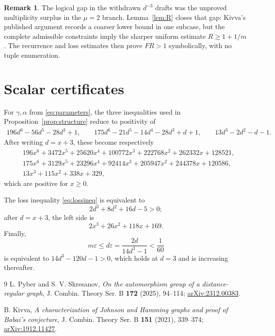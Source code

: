 \documentclass[11pt]{amsart}
\theoremstyle{definition}
\newtheorem{remark}[theorem]{Remark}
\newcommand{\eps}{\varepsilon}
\newcommand{\gam}{\gamma}
\begin{document}
\begin{remark}
The logical gap in the withdrawn $d^{-3}$ drafts was the unproved multiplicity surplus in the $\mu=2$ branch.  Lemma~\ref{lem:R} closes that gap: Kivva's published argument records a coarser lower bound in one subcase, but the complete admissible constraints imply the sharper uniform estimate $R\ge1+1/m$.  The recurrence and loss estimates then prove $FR>1$ symbolically, with no tuple enumeration.
\end{remark}

\appendix
\section{Scalar certificates}\label{sec:scalar}
For $\gam,\alpha$ from \eqref{eq:parameters}, the three inequalities used in Proposition~\ref{prop:structure} reduce to positivity of
\begin{align*}
 196d^6-56d^5-28d^3+1,
 \qquad
 175d^6-21d^5-14d^4-28d^3+d+1,
 \qquad
 13d^3-2d^2-d-1.
\end{align*}
After writing $d=x+3$, these become respectively
\begin{align*}
 &196x^6+3472x^5+25620x^4+100772x^3
   +222768x^2+262332x+128521,\\
 &175x^6+3129x^5+23296x^4+92414x^3
   +205947x^2+244378x+120586,\\
 &13x^3+115x^2+338x+329,
\end{align*}
which are positive for $x\ge0$.

The loss inequality \eqref{eq:lossineq} is equivalent to
\[
 2d^3+8d^2+16d-5>0;
\]
after $d=x+3$, the left side is
\[
 2x^3+26x^2+118x+169.
\]
Finally,
\[
 m\eps\le d\eps=\frac{2d}{14d^3-1}<\frac1{60}
\]
is equivalent to $14d^3-120d-1>0$, which holds at $d=3$ and is increasing thereafter.

\begin{thebibliography}{9}
L. Pyber and S. V. Skresanov,
\emph{On the automorphism group of a distance-regular graph},
J. Combin. Theory Ser. B \textbf{172} (2025), 94--114;
\href{https://arxiv.org/abs/2312.00383}{arXiv:2312.00383}.

B. Kivva,
\emph{A characterization of Johnson and Hamming graphs and proof of Babai's conjecture},
J. Combin. Theory Ser. B \textbf{151} (2021), 339--374;
\href{https://arxiv.org/abs/1912.11427}{arXiv:1912.11427}.
\end{thebibliography}
\end{document}
